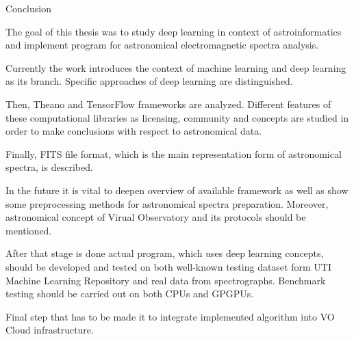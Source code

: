 \chap Conclusion

The goal of this thesis was to study deep learning in context of
astroinformatics and implement program for astronomical electromagnetic spectra
analysis.

Currently the work introduces the context of machine learning and deep learning
as its branch. Specific approaches of deep learning are distinguished.

Then, Theano and TensorFlow frameworks are analyzed. Different features of these
computational libraries as licensing, community and concepts are studied in
order to make conclusions with respect to astronomical data.

Finally, FITS file format, which is the main representation form of astronomical
spectra, is described.

In the future it is vital to deepen overview of available framework as well
as show some preprocessing methods for astronomical spectra preparation.
Moreover, astronomical concept of Virual Observatory and its protocols should
be mentioned.

After that stage is done actual program, which uses deep learning concepts,
should be developed and tested on both well-known testing dataset form UTI
Machine Learning Repository
and real data from spectrographs.
Benchmark testing should be carried out on both CPUs and GPGPUs.

Final step that has to be made it to integrate implemented algorithm into VO
Cloud infrastructure.
